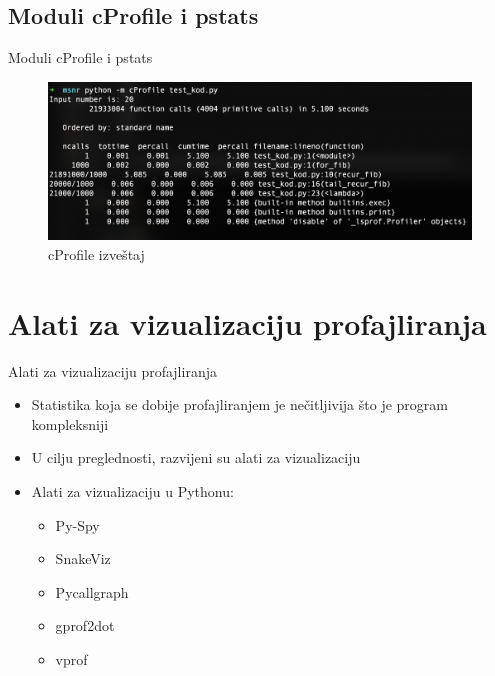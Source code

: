 \documentclass{beamer}
\begin{document}
\subsection{Moduli cProfile i pstats}
\begin{frame}{Moduli cProfile i pstats}
\begin{figure}[h!]
\begin{center}
\includegraphics[scale=0.4]{MVJ_02_ProfajleriZaPython_ZecevicSmiljanicMilovanovicPopov/cProfile_without_import.png}
\end{center}
\caption{cProfile izveštaj}
\label{fig:ps_viz}
\end{figure}

\begin{center}
\end{center}
\end{frame}

\section{Alati za vizualizaciju profajliranja}
\begin{frame}{Alati za vizualizaciju profajliranja}
\begin{itemize}
\item Statistika koja se dobije profajliranjem je nečitljivija što je program kompleksniji
\item U cilju preglednosti, razvijeni su alati za vizualizaciju
\item Alati za vizualizaciju u Pythonu:
\begin{itemize}
\item Py-Spy
\item SnakeViz
\item Pycallgraph
\item gprof2dot
\item vprof
\end{itemize}
\end{itemize}
\end{frame}
\end{document}
